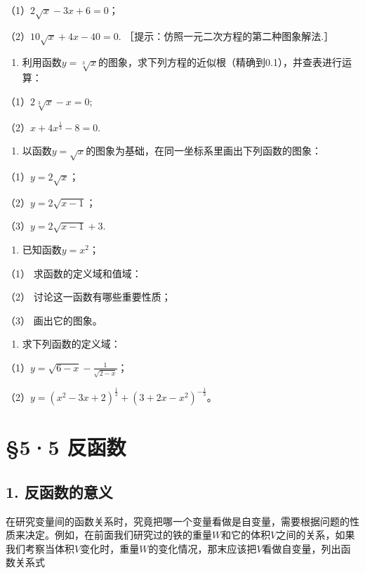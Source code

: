 （1）\(2\sqrt{x} - 3x + 6 = 0\)；

（2）\(10\sqrt{x} + 4x - 40 = 0.\)
［提示：仿照一元二次方程的第二种图象解法.］

\begin{enumerate}[start=2]
\item
  利用函数\(y = \sqrt[3]{x}\)的图象，求下列方程的近似根（精确到0.1），并查表进行运算：
\end{enumerate}

（1）\(2\sqrt[3]{x} - x = 0;\)

（2）\(x + 4x^{\frac{1}{3}} - 8 = 0.\)

\begin{enumerate}[start=3]
\item
  以函数\(y = \sqrt{x}\)的图象为基础，在同一坐标系里画出下列函数的图象：
\end{enumerate}

（1）\(y = 2\sqrt{x}\)；

（2）\(y = 2\sqrt{x - 1}\)；

（3）\(y = 2\sqrt{x - 1} + 3.\)

\begin{enumerate}[start=4]
\item
  已知函数\(y = x^2\)；
\end{enumerate}

（1） 求函数的定义域和值域：

（2） 讨论这一函数有哪些重要性质；

（3） 画出它的图象。

\begin{enumerate}[start=5]
\item
  求下列函数的定义域：
\end{enumerate}

（1）\(y = \sqrt{6 - x} - \frac{1}{\sqrt{2 - x}}\)；

（2）\(y = (x^2 - 3x + 2)^{\frac{1}{2}} + (3 + 2x - x^2)^{-\frac{1}{3}}\)。

\section{§5·5 反函数}

\subsection{1. 反函数的意义}

在研究变量间的函数关系时，究竟把哪一个变量看做是自变量，需要根据问题的性质来决定。例如，在前面我们研究过的铁的重量\(W\)和它的体积\(V\)之间的关系，如果我们考察当体积\(V\)变化时，重量\(W\)的变化情况，那末应该把\(V\)看做自变量，列出函数关系式

